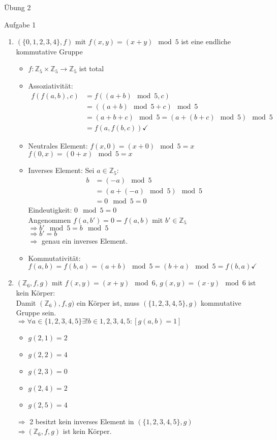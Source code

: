 \begin{section}{Übung 2}
 \begin{subsection}{Aufgabe 1}
  \begin{enumerate}
   \item $(\{0,1,2,3,4\}, f)$ mit $f(x,y) = (x+y) \mod  5$ ist eine endliche kommutative Gruppe
   \begin{itemize}
    \item $f: \mathbb{Z}_5 \times \mathbb{Z}_5 \rightarrow \mathbb{Z}_5$ ist total \checkmark
    \item Assoziativität: 
    \begin{align*}
      f(f(a,b),c) & = f((a+b) \mod  5,c) \\
      & = ((a+b) \mod 5 +c) \mod 5 \\
      & = (a+b+c) \mod 5 = (a+(b+c)\mod 5)\mod 5 \\
      & = f(a,f(b,c)) \checkmark
    \end{align*}
    \item Neutrales Element: $f(x,0) = (x+0)\mod 5 = x$ \\
    $f(0,x) = (0+x)\mod 5 = x$
    \item Inverses Element: Sei $a \in \mathbb{Z}_5$:
    \begin{align*}
      b &= (-a)\mod 5 \\
      &= (a+(-a)\mod 5)\mod 5 \\
      &= 0\mod 5 = 0
    \end{align*}
    Eindeutigkeit: $0\mod 5 =  0$ \checkmark \\
    Angenommen $f(a,b') = 0  = f(a,b)$ mit $b' \in \mathbb{Z}_5$ \\
    $\Rightarrow b' \mod 5 = b\mod 5$\\
    $\Rightarrow b' = b$\\
    $\Rightarrow$ genau ein inverses Element.
    \item Kommutativität: \\
    $f(a,b) = f(b,a) = (a+b)\mod 5 = (b+a)\mod 5 = f(b,a) \checkmark$
   \end{itemize}
    \item $(\mathbb{Z}_6,f,g)$ mit $f(x,y) = (x+y)\mod 6$, $g(x,y) = (x\cdot y)\mod 6$ ist kein Körper: \\
    Damit $(\mathbb{Z}_6),f,g)$ ein Körper ist, muss $(\{1,2,3,4,5\},g)$ kommutative Gruppe sein. \\
    $\Rightarrow \forall a \in \{1,2,3,4,5\} \exists! b \in {1,2,3,4,5}: [g(a,b) = 1]$
    \begin{itemize}
     \item $g(2,1) = 2$
     \item $g(2,2) = 4$
     \item $g(2,3) = 0$
     \item $g(2,4) = 2$
     \item $g(2,5) = 4$
    \end{itemize}
    $\Rightarrow$ 2 besitzt kein inverses Element in $(\{1,2,3,4,5\},g)$ \\
    $\Rightarrow (\mathbb{Z}_6,f,g)$ ist kein Körper.


\end{enumerate}
\end{subsection}
\end{section}
